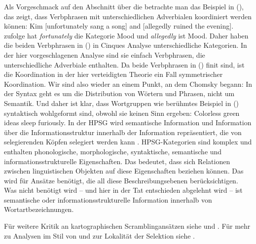 Als Vorgeschmack auf den Abschnitt über die  betrachte man das Beispiel in (), das zeigt, dass Verbphrasen mit unterschiedlichen Adverbialen koordiniert werden können:
\ea
Kim [unfortunately sang a song] and [allegedly ruined the evening].
\z
\citet[]{Cinque99a-u} zufolge hat \emph{fortunately} die Kategorie Mood und
\emph{allegedly} ist Mood. Daher haben die beiden Verbphrasen in () in Cinques Analyse unterschiedliche
Kategorien. In der hier vorgeschlagenen Analyse sind sie einfach Verbphrasen,
die unterschiedliche Adverbiale enthalten. Da beide Verbphrasen in () finit sind, ist die Koordination
in der hier verteidigten Theorie ein Fall symmetrischer Koordination. Wir sind also wieder an einem Punkt, an dem
Chomsky begann: In der Syntax geht es um die Distribution von Wörtern und Phrasen, nicht um Semantik. Und daher
ist klar, dass Wortgruppen wie  berühmtes Beispiel in ()
syntaktisch wohlgeformt sind, obwohl sie keinen Sinn ergeben:
\ea
Colorless green ideas sleep furiously.
\z
In der HPSG wird semantische Information und Information über die Informationsstruktur innerhalb der
Information repräsentiert, die 
von selegierenden Köpfen selegiert werden kann \parencites[Abschnitt~2.4]{ps2}[]{BC2010a}. HPSG-Kategorien sind komplex und enthalten phonologische, morphologische,
syntaktische, semantische und informationsstrukturelle Eigenschaften. Das bedeutet, dass sich Relationen zwischen
linguistischen Objekten auf diese Eigenschaften beziehen können. Das wird für Ansätze benötigt, die
all diese Beschreibungsebenen berücksichtigen. Was nicht benötigt wird -- und hier in der Tat entschieden abgelehnt
wird -- ist semantische oder informationsstrukturelle Information innerhalb von Wortartbezeichnungen.



Für weitere Kritik an kartographischen Scramblingansätzen siehe  und .
Für mehr zu Analysen im Stil von \citeauthor{CR2010a} und zur Lokalität der Selektion siehe .


